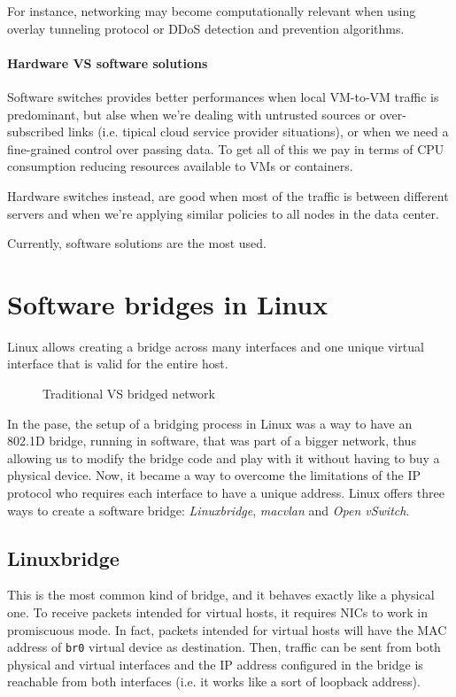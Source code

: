 \begin{note}
    For instance, networking may become computationally relevant when using
    overlay tunneling protocol or DDoS detection and prevention algorithms.
\end{note}

\paragraph{Hardware VS software solutions}
Software switches provides better performances when local VM-to-VM traffic is
predominant, but alse when we're dealing with untrusted sources or over-subscribed
links (i.e. tipical cloud service provider situations), or when we need a
fine-grained control over passing data. To get all of this we pay in terms of
CPU consumption reducing resources available to VMs or containers.

Hardware switches instead, are good when most of the traffic is between different
servers and when we're applying similar policies to all nodes in the data center.

Currently, software solutions are the most used.

\section{Software bridges in Linux}
Linux allows creating a bridge across many interfaces and one unique virtual
interface that is valid for the entire host.

\begin{figure}[h!]
    \centering
    \hspace{1.5cm}
    \caption{Traditional VS bridged network}
\end{figure}

\noindent
In the pase, the setup of a bridging process in Linux was a way to have an 802.1D
bridge, running in software, that was part of a bigger network, thus allowing
us to modify the bridge code and play with it without having to buy a physical
device. Now, it became a way to overcome the limitations of the IP protocol who
requires each interface to have a unique address. Linux offers three ways to
create a software bridge: \emph{Linuxbridge}, \emph{macvlan} and \emph{Open
vSwitch}.

\subsection{Linuxbridge}
This is the most common kind of bridge, and it behaves exactly like a physical
one. To receive packets intended for virtual hosts, it requires NICs to work in
promiscuous mode. In fact, packets intended for virtual hosts will have the MAC
address of \texttt{br0} virtual device as destination. Then, traffic can be
sent from both physical and virtual interfaces and the IP address configured in
the bridge is reachable from both interfaces (i.e. it works like a sort of
loopback address).

